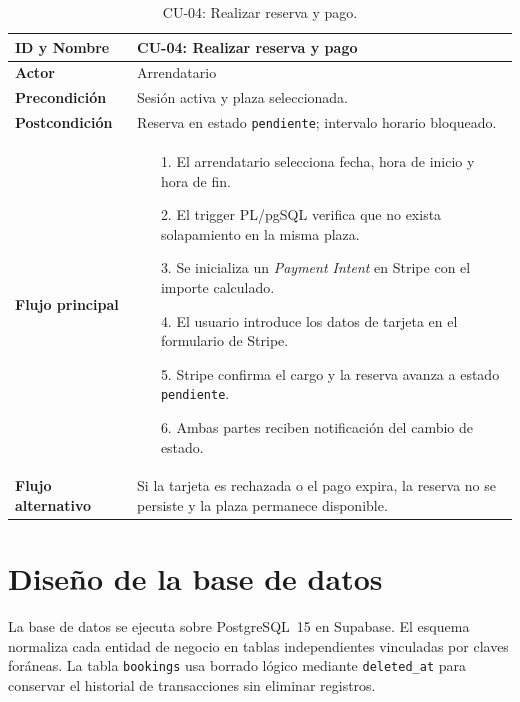 \begin{table}[htbp]
\centering
\caption{CU-04: Realizar reserva y pago.}
\label{tab:cu-04}
\begin{tabularx}{\textwidth}{|>{\columncolor{gray!15}\bfseries}l|X|}
\hline
ID y Nombre    & CU-04: Realizar reserva y pago \\ \hline
Actor          & Arrendatario \\ \hline
Precondición   & Sesión activa y plaza seleccionada. \\ \hline
Postcondición  & Reserva en estado \texttt{pendiente}; intervalo horario bloqueado. \\ \hline
Flujo principal &
\begin{itemize}[leftmargin=3mm, itemsep=0mm, topsep=1mm]
\item[1.] El arrendatario selecciona fecha, hora de inicio y hora de fin.
\item[2.] El trigger PL/pgSQL verifica que no exista solapamiento en la misma plaza.
\item[3.] Se inicializa un \textit{Payment Intent} en Stripe con el importe calculado.
\item[4.] El usuario introduce los datos de tarjeta en el formulario de Stripe.
\item[5.] Stripe confirma el cargo y la reserva avanza a estado \texttt{pendiente}.
\item[6.] Ambas partes reciben notificación del cambio de estado.
\end{itemize} \\ \hline
Flujo alternativo & Si la tarjeta es rechazada o el pago expira, la reserva no se persiste y la plaza permanece disponible. \\ \hline
\end{tabularx}
\end{table}

\section{Diseño de la base de datos}
\label{sec:diseno-bd}

La base de datos se ejecuta sobre PostgreSQL~15 en Supabase. El esquema normaliza cada entidad de negocio en tablas independientes vinculadas por claves foráneas. La tabla \texttt{bookings} usa borrado lógico mediante \texttt{deleted\_at} para conservar el historial de transacciones sin eliminar registros.

